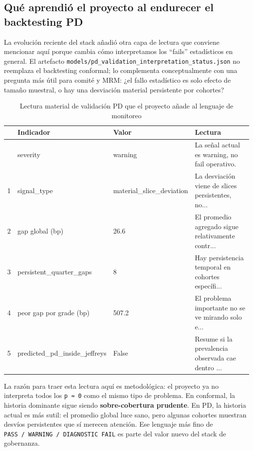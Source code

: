 \documentclass[
  spanish,
  11pt,
  letterpaper,
]{scrbook}
\theoremstyle{plain}
\theoremstyle{remark}
\begin{document}
\subsection{Qué aprendió el proyecto al endurecer el backtesting
PD}\label{quuxe9-aprendiuxf3-el-proyecto-al-endurecer-el-backtesting-pd}

La evolución reciente del stack añadió otra capa de lectura que conviene
mencionar aquí porque cambia cómo interpretamos los ``fails''
estadísticos en general. El artefacto
\texttt{models/pd\_validation\_interpretation\_status.json} no reemplaza
el backtesting conformal; lo complementa conceptualmente con una
pregunta más útil para comité y MRM: ¿el fallo estadístico es solo
efecto de tamaño muestral, o hay una desviación material persistente por
cohortes?

{

\begin{longtable}[]{@{}llll@{}}

\caption{\label{tbl-pd-validation-interpretation}Lectura material de
validación PD que el proyecto añade al lenguaje de monitoreo}

\tabularnewline

\toprule\noalign{}
& Indicador & Valor & Lectura \\
\midrule\noalign{}
\endhead
\bottomrule\noalign{}
\endlastfoot
0 & severity & warning & La señal actual es warning, no fail
operativo. \\
1 & signal\_type & material\_slice\_deviation & La desviación viene de
slices persistentes, no... \\
2 & gap global (bp) & 26.6 & El promedio agregado sigue relativamente
contr... \\
3 & persistent\_quarter\_gaps & 8 & Hay persistencia temporal en
cohortes específi... \\
4 & peor gap por grade (bp) & 507.2 & El problema importante no se ve
mirando solo e... \\
5 & predicted\_pd\_inside\_jeffreys & False & Resume si la prevalencia
observada cae dentro ... \\

\end{longtable}

}

La razón para traer esta lectura aquí es metodológica: el proyecto ya no
interpreta todos los \texttt{p\ ≈\ 0} como el mismo tipo de problema. En
conformal, la historia dominante sigue siendo \textbf{sobre-cobertura
prudente}. En PD, la historia actual es más sutil: el promedio global
luce sano, pero algunas cohortes muestran desvíos persistentes que sí
merecen atención. Ese lenguaje más fino de
\texttt{PASS\ /\ WARNING\ /\ DIAGNOSTIC\ FAIL} es parte del valor nuevo
del stack de gobernanza.
\end{document}
